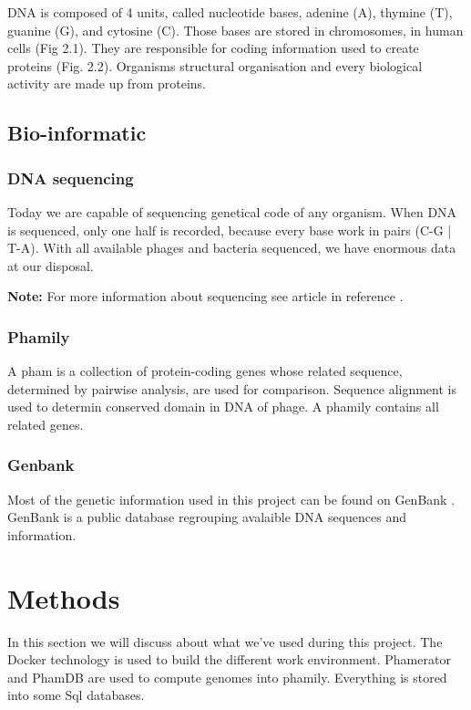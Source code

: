 \documentclass[a4paper,11pt]{report}
\begin{document}
DNA is composed of 4 units, called nucleotide bases, adenine (A), thymine (T), guanine (G), and cytosine (C). Those bases are stored in chromosomes, in human cells (Fig 2.1). They are responsible for coding information used to create proteins (Fig. 2.2). Organisms structural organisation and every biological activity are made up from proteins.
\vspace{-0.6cm}
\section{Bio-informatic}
\vspace{-0.6cm}
\subsection{DNA sequencing}
\vspace{-0.2cm}
Today we are capable of sequencing genetical code of any organism. When DNA is sequenced, only one half is recorded, because every base work in pairs (C-G | T-A). With all available phages and bacteria sequenced, we have enormous data at our disposal.

\textbf{Note:} For more information about sequencing see article in reference \cite{ref9}.

\subsection{Phamily}
\vspace{-0.2cm}
A pham is a collection of protein-coding genes whose related sequence, determined by pairwise analysis, are used for comparison. Sequence alignment is used to determin conserved domain in DNA of phage. A phamily contains all related genes.

\subsection{Genbank}
\vspace{-0.2cm}
Most of the genetic information used in this project can be found on GenBank \cite{ref10}. GenBank is a public database regrouping avalaible DNA sequences and information.


\chapter{Methods}
In this section we will discuss about what we've used during this project. The Docker technology is used to build the different work environment. Phamerator and PhamDB are used to compute genomes into phamily. Everything is stored into some Sql databases.
\end{document}
